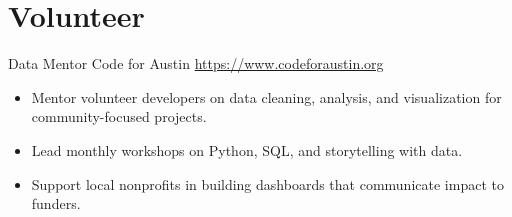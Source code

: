\documentclass[a4paper, serif, 10pt]{moderncv}
\begin{document}
\section{Volunteer}

        {Data Mentor}
        {Code for Austin}
        {\url{https://www.codeforaustin.org}}
        {}
        {\begin{itemize}
\item Mentor volunteer developers on data cleaning, analysis, and visualization for community-focused projects.
\item Lead monthly workshops on Python, SQL, and storytelling with data.
\item Support local nonprofits in building dashboards that communicate impact to funders.
\end{itemize}}
    
\end{document}
